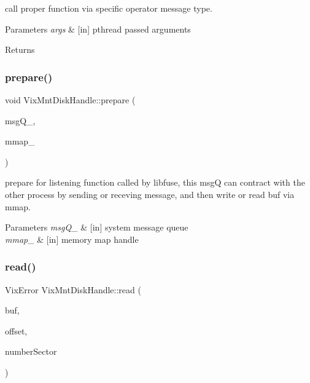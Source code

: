 call proper function via specific operator message type. 


\begin{DoxyParams}{Parameters}
{\em args} & \mbox{[}in\mbox{]} pthread passed arguments\\
\hline
\end{DoxyParams}
\begin{DoxyReturn}{Returns}

\end{DoxyReturn}
\hypertarget{class_vix_mnt_disk_handle_a254eabad8d4f3c619898e131f0db7f36}{}\label{class_vix_mnt_disk_handle_a254eabad8d4f3c619898e131f0db7f36} 
\subsubsection{\texorpdfstring{prepare()}{prepare()}}
{\ttfamily void Vix\+Mnt\+Disk\+Handle\+::prepare (\begin{DoxyParamCaption}\item[{\hyperlink{class_vix_mnt_msg_que}{Vix\+Mnt\+Msg\+Que} $\ast$}]{msg\+Q\+\_\+,  }\item[{\hyperlink{class_vix_mnt_mmap}{Vix\+Mnt\+Mmap} $\ast$}]{mmap\+\_\+ }\end{DoxyParamCaption})}



prepare for listening function called by libfuse, this msgQ can contract with the other process by sending or receving message, and then write or read buf via mmap. 


\begin{DoxyParams}{Parameters}
{\em msg\+Q\+\_\+} & \mbox{[}in\mbox{]} system message queue \\
\hline
{\em mmap\+\_\+} & \mbox{[}in\mbox{]} memory map handle \\
\hline
\end{DoxyParams}
\hypertarget{class_vix_mnt_disk_handle_a58eb682826a8be39431c258aa531a00c}{}\label{class_vix_mnt_disk_handle_a58eb682826a8be39431c258aa531a00c} 
\subsubsection{\texorpdfstring{read()}{read()}\hspace{0.1cm}{\footnotesize\ttfamily [1/2]}}
{\ttfamily Vix\+Error Vix\+Mnt\+Disk\+Handle\+::read (\begin{DoxyParamCaption}\item[{uint8 $\ast$}]{buf,  }\item[{uint64}]{offset,  }\item[{uint64}]{number\+Sector }\end{DoxyParamCaption})}



